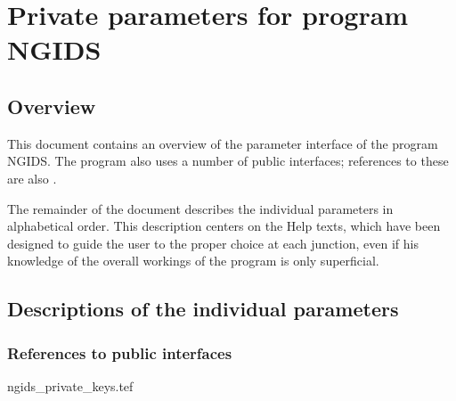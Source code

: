 
\chapter{ Private parameters for program NGIDS}
\tableofcontents


\section{ Overview}

	This document contains an overview of the parameter interface of the
program NGIDS. The program also uses a number of public interfaces; references
to these are also .



	The remainder of the document describes the individual parameters in
alphabetical order. This description centers on the Help texts, which have been
designed to guide the user to the proper choice at each junction, even if his
knowledge of the overall workings of the program is only superficial.


\section{ Descriptions of the individual parameters}
\label{.descriptions}

\subsection{ References to public interfaces}
\label{.public}

 {ngids_private_keys.tef}
